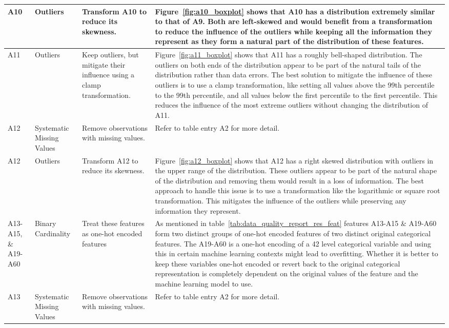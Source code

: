 \documentclass[11pt]{report}
\begin{document}
\begin{longtable}{p{2cm}p{3cm}p{4cm}p{6cm}}
\midrule
A10 & Outliers & Transform A10 to reduce its skewness. &  Figure~\ref{fig:a10_boxplot} shows that A10 has a distribution extremely similar to that of A9. Both are left-skewed and would benefit from a transformation to reduce the influence of the outliers while keeping all the information they represent as they form a natural part of the distribution of these features. \\
\midrule
A11 & Outliers & Keep outliers, but mitigate their influence using a clamp transformation. & Figure~\ref{fig:a11_boxplot} shows that A11 has a roughly bell-shaped distribution. The outliers on both ends of the distribution appear to be part of the natural tails of the distribution rather than data errors. The best solution to mitigate the influence of these outliers is to use a clamp transformation, like setting all values above the 99th percentile to the 99th percentile, and all values below the first percentile to the first percentile. This reduces the influence of the most extreme outliers without changing the distribution of A11. \\
\midrule
A12 & Systematic Missing Values & Remove observations with missing values. & Refer to table entry A2 for more detail. \\
\midrule
A12 & Outliers & Transform A12 to reduce its skewness. & Figure~\ref{fig:a12_boxplot} shows that A12 has a right skewed distribution with outliers in the upper range of the distribution. These outliers appear to be part of the natural shape of the distribution and removing them would result in a loss of information. The best approach to handle this issue is to use a transformation like the logarithmic or square root transformation. This mitigates the influence of the outliers while preserving any information they represent. \\
\midrule
A13-A15, \& A19-A60 & Binary Cardinality & Treat these features as one-hot encoded features & As mentioned in table~\ref{tab:data_quality_report_res_feat} features A13-A15 \& A19-A60 form two distinct groups of one-hot encoded features of two distinct original categorical features. The A19-A60 is a one-hot encoding of a 42 level categorical variable and using this in certain machine learning contexts might lead to overfitting. Whether it is better to keep these variables one-hot encoded or revert back to the original categorical representation is completely dependent on the original values of the feature and the machine learning model to use. \\
\midrule
A13 & Systematic Missing Values & Remove observations with missing values. & Refer to table entry A2 for more detail. \\

\end{longtable}
\end{document}
